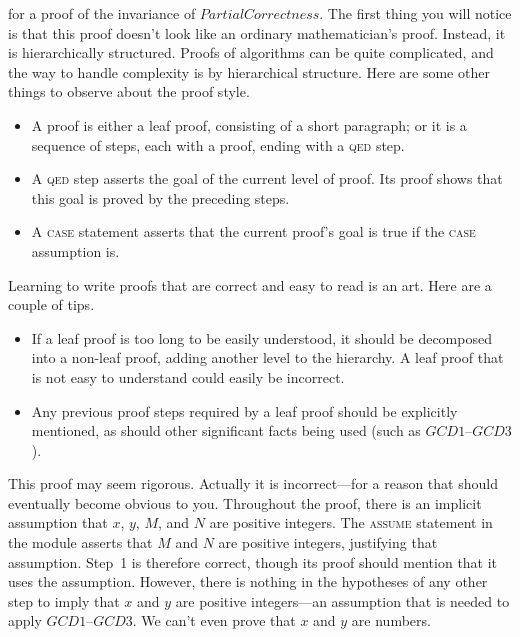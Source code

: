 \documentclass[fleqn,leqno]{article}
\begin{document}
 for a proof of the invariance of
$PartialCorrectness$.  The first thing you will notice is that this
proof doesn't look like an ordinary mathematician's proof.  Instead,
it is hierarchically structured.  Proofs of algorithms can be quite
complicated, and the way to handle complexity is by hierarchical
structure.  Here are some other things to observe about the proof style.
\begin{itemize}
\item A proof is either a leaf proof, consisting of a short paragraph;
or it is a sequence of steps, each with a proof, ending with a
\textsc{qed} step.  

\item A \textsc{qed} step asserts the goal of the current level of
proof.  Its proof shows that this goal is proved by the preceding
steps.

\item A \textsc{case} statement asserts that the current proof's goal
is true if the \textsc{case} assumption is.
\end{itemize}
Learning to write proofs that are correct and easy to read is an art.
Here are a couple of tips.
\begin{itemize}
\item If a leaf proof is too long to be easily understood, it should
be decomposed into a non-leaf proof, adding another level to the
hierarchy.  A leaf proof that is not easy to understand could easily
be incorrect.

\item Any previous proof steps required by a leaf proof should
be explicitly mentioned, as should other significant facts being
used (such as $GCD1$--$GCD3$).
\end{itemize}
This proof may seem rigorous.  Actually it is incorrect---for a reason
that should eventually become obvious to you.  Throughout the proof,
there is an implicit assumption that $x$, $y$, $M$, and $N$ are
positive integers.  The \textsc{assume} statement in the module
asserts that $M$ and $N$ are positive integers, justifying that
assumption.  Step~1 is therefore correct, though its proof should
mention that it uses the assumption.  However, there is nothing in the
hypotheses of any other step to imply that $x$ and $y$ are positive
integers---an assumption that is needed to apply $GCD1$--$GCD3$.  We
can't even prove that $x$ and $y$ are numbers.
\end{document}
